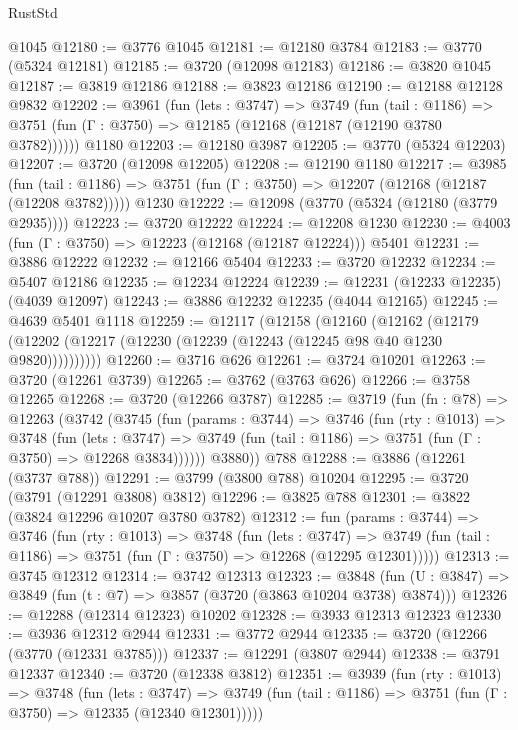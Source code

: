 \begin{lexlean}{RustStd}
\begin{coremodule}
    @1045
@12180 := @3776 @1045
@12181 := @12180 @3784
@12183 := @3770 (@5324 @12181)
@12185 := @3720 (@12098 @12183)
@12186 := @3820 @1045
@12187 := @3819 @12186
@12188 := @3823 @12186
@12190 := @12188 @12128 @9832
@12202 := @3961
    (fun (lets : @3747) =>
    @3749
      (fun (tail : @1186) =>
      @3751 (fun (Γ : @3750) => @12185 (@12168 (@12187 (@12190 @3780 @3782))))))
    @1180
@12203 := @12180 @3987
@12205 := @3770 (@5324 @12203)
@12207 := @3720 (@12098 @12205)
@12208 := @12190 @1180
@12217 := @3985
    (fun (tail : @1186) => @3751 (fun (Γ : @3750) => @12207 (@12168 (@12187 (@12208 @3782)))))
    @1230
@12222 := @12098 (@3770 (@5324 (@12180 (@3779 @2935))))
@12223 := @3720 @12222
@12224 := @12208 @1230
@12230 := @4003 (fun (Γ : @3750) => @12223 (@12168 (@12187 @12224))) @5401
@12231 := @3886 @12222
@12232 := @12166 @5404
@12233 := @3720 @12232
@12234 := @5407 @12186
@12235 := @12234 @12224
@12239 := @12231 (@12233 @12235) (@4039 @12097)
@12243 := @3886 @12232 @12235 (@4044 @12165)
@12245 := @4639 @5401 @1118
@12259 := @12117
    (@12158
      (@12160
        (@12162
          (@12179 (@12202 (@12217 (@12230 (@12239 (@12243 (@12245 @98 @40 @1230 @9820))))))))))
@12260 := @3716 @626
@12261 := @3724 @10201
@12263 := @3720 (@12261 @3739)
@12265 := @3762 (@3763 @626)
@12266 := @3758 @12265
@12268 := @3720 (@12266 @3787)
@12285 := @3719
    (fun (fn : @78) =>
    @12263
      (@3742
        (@3745
          (fun (params : @3744) =>
          @3746
            (fun (rty : @1013) =>
            @3748
              (fun (lets : @3747) =>
              @3749 (fun (tail : @1186) => @3751 (fun (Γ : @3750) => @12268 @3834))))))
        @3880))
    @788
@12288 := @3886 (@12261 (@3737 @788))
@12291 := @3799 (@3800 @788) @10204
@12295 := @3720 (@3791 (@12291 @3808) @3812)
@12296 := @3825 @788
@12301 := @3822 (@3824 @12296 @10207 @3780 @3782)
@12312 := fun (params : @3744) =>
  @3746
    (fun (rty : @1013) =>
    @3748
      (fun (lets : @3747) =>
      @3749 (fun (tail : @1186) => @3751 (fun (Γ : @3750) => @12268 (@12295 @12301)))))
@12313 := @3745 @12312
@12314 := @3742 @12313
@12323 := @3848
    (fun (U : @3847) => @3849 (fun (t : @7) => @3857 (@3720 (@3863 @10204 @3738) @3874)))
@12326 := @12288 (@12314 @12323) @10202
@12328 := @3933 @12313 @12323
@12330 := @3936 @12312 @2944
@12331 := @3772 @2944
@12335 := @3720 (@12266 (@3770 (@12331 @3785)))
@12337 := @12291 (@3807 @2944)
@12338 := @3791 @12337
@12340 := @3720 (@12338 @3812)
@12351 := @3939
    (fun (rty : @1013) =>
    @3748
      (fun (lets : @3747) =>
      @3749 (fun (tail : @1186) => @3751 (fun (Γ : @3750) => @12335 (@12340 @12301)))))

\end{coremodule}
\end{lexlean}
